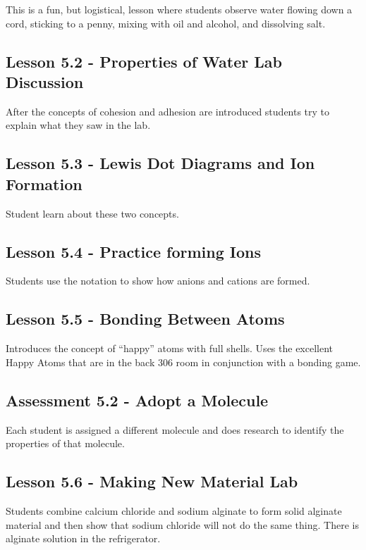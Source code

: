 \documentclass[12pt]{article}
\begin{document}
This is a fun, but logistical, lesson where students observe water flowing down a cord, sticking to a penny, mixing with oil and alcohol, and dissolving salt.

\subsection{Lesson 5.2 - Properties of Water Lab Discussion}

After the concepts of cohesion and adhesion are introduced students try to explain what they saw in the lab.

\subsection{Lesson 5.3 - Lewis Dot Diagrams and Ion Formation} 

Student learn about these two concepts.

\subsection{Lesson 5.4 - Practice forming Ions} 

Students use the notation to show how anions and cations are formed.

\subsection{Lesson 5.5 - Bonding Between Atoms} 

Introduces the concept of “happy” atoms with full shells. Uses the excellent Happy Atoms that are in the back 306 room in conjunction with a bonding game.

\subsection*{Assessment 5.2 - Adopt a Molecule} 

Each student is assigned a different molecule and does research to identify the properties of that molecule.

\subsection{Lesson 5.6 - Making New Material Lab} 

Students combine calcium chloride and sodium alginate to form solid alginate material and then show that sodium chloride will not do the same thing. There is alginate solution in the refrigerator.
\end{document}
